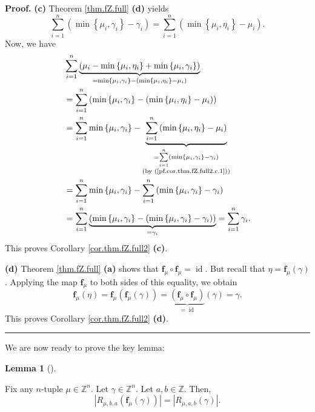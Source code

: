 \documentclass[numbers=enddot,12pt,final,onecolumn,notitlepage]{scrartcl}%
\theoremstyle{definition}
\newtheorem{lem}[theo]{Lemma}
\newenvironment{lemma}[1][]
{\begin{lem}[#1]\begin{leftbar}}
{\end{leftbar}\end{lem}}
\newenvironment{proof}[1][Proof]{\noindent\textbf{#1.} }{\ \rule{0.5em}{0.5em}}
\let\sumnonlimits\sum
\renewcommand{\sum}{\sumnonlimits\limits}
\begin{document}
\begin{proof}
\textbf{(c)} Theorem \ref{thm.fZ.full} \textbf{(d)} yields%
\begin{equation}
\sum_{i=1}^{n}\left(  \min\left\{  \mu_{i},\gamma_{i}\right\}  -\gamma
_{i}\right)  =\sum_{i=1}^{n}\left(  \min\left\{  \mu_{i},\eta_{i}\right\}
-\mu_{i}\right)  . \label{pf.cor.thm.fZ.full2.c.1}%
\end{equation}
Now, we have
\begin{align*}
&  \sum_{i=1}^{n}\underbrace{\left(  \mu_{i}-\min\left\{  \mu_{i},\eta
_{i}\right\}  +\min\left\{  \mu_{i},\gamma_{i}\right\}  \right)  }%
_{=\min\left\{  \mu_{i},\gamma_{i}\right\}  -\left(  \min\left\{  \mu_{i}%
,\eta_{i}\right\}  -\mu_{i}\right)  }\\
&  =\sum_{i=1}^{n}\left(  \min\left\{  \mu_{i},\gamma_{i}\right\}  -\left(
\min\left\{  \mu_{i},\eta_{i}\right\}  -\mu_{i}\right)  \right) \\
&  =\sum_{i=1}^{n}\min\left\{  \mu_{i},\gamma_{i}\right\}  -\underbrace{\sum
_{i=1}^{n}\left(  \min\left\{  \mu_{i},\eta_{i}\right\}  -\mu_{i}\right)
}_{\substack{=\sum_{i=1}^{n}\left(  \min\left\{  \mu_{i},\gamma_{i}\right\}
-\gamma_{i}\right)  \\\text{(by (\ref{pf.cor.thm.fZ.full2.c.1}))}}}\\
&  =\sum_{i=1}^{n}\min\left\{  \mu_{i},\gamma_{i}\right\}  -\sum_{i=1}%
^{n}\left(  \min\left\{  \mu_{i},\gamma_{i}\right\}  -\gamma_{i}\right) \\
&  =\sum_{i=1}^{n}\underbrace{\left(  \min\left\{  \mu_{i},\gamma_{i}\right\}
-\left(  \min\left\{  \mu_{i},\gamma_{i}\right\}  -\gamma_{i}\right)  \right)
}_{=\gamma_{i}}=\sum_{i=1}^{n}\gamma_{i}.
\end{align*}
This proves Corollary \ref{cor.thm.fZ.full2} \textbf{(c)}.

\textbf{(d)} Theorem \ref{thm.fZ.full} \textbf{(a)} shows that $\mathbf{f}%
_{\mu}\circ\mathbf{f}_{\mu}=\operatorname*{id}$. But recall that
$\eta=\mathbf{f}_{\mu}\left(  \gamma\right)  $. Applying the map
$\mathbf{f}_{\mu}$ to both sides of this equality, we obtain%
\[
\mathbf{f}_{\mu}\left(  \eta\right)  =\mathbf{f}_{\mu}\left(  \mathbf{f}_{\mu
}\left(  \gamma\right)  \right)  =\underbrace{\left(  \mathbf{f}_{\mu}%
\circ\mathbf{f}_{\mu}\right)  }_{=\operatorname*{id}}\left(  \gamma\right)
=\gamma.
\]
This proves Corollary \ref{cor.thm.fZ.full2} \textbf{(d)}.
\end{proof}

We are now ready to prove the key lemma:

\begin{lemma}
\label{lem.fZ.lr}Fix any $n$-tuple $\mu\in\mathbb{Z}^{n}$. Let $\gamma
\in\mathbb{Z}^{n}$. Let $a,b\in\mathbb{Z}$. Then,%
\[
\left\vert R_{\mu,b,a}\left(  \mathbf{f}_{\mu}\left(  \gamma\right)  \right)
\right\vert =\left\vert R_{\mu,a,b}\left(  \gamma\right)  \right\vert .
\]

\end{lemma}
\end{document}
